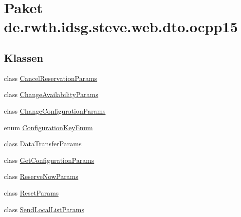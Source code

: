 \hypertarget{namespacede_1_1rwth_1_1idsg_1_1steve_1_1web_1_1dto_1_1ocpp15}{\section{Paket de.\-rwth.\-idsg.\-steve.\-web.\-dto.\-ocpp15}
\label{namespacede_1_1rwth_1_1idsg_1_1steve_1_1web_1_1dto_1_1ocpp15}
}
\subsection*{Klassen}
\begin{DoxyCompactItemize}
\item 
class \hyperlink{classde_1_1rwth_1_1idsg_1_1steve_1_1web_1_1dto_1_1ocpp15_1_1_cancel_reservation_params}{Cancel\-Reservation\-Params}
\item 
class \hyperlink{classde_1_1rwth_1_1idsg_1_1steve_1_1web_1_1dto_1_1ocpp15_1_1_change_availability_params}{Change\-Availability\-Params}
\item 
class \hyperlink{classde_1_1rwth_1_1idsg_1_1steve_1_1web_1_1dto_1_1ocpp15_1_1_change_configuration_params}{Change\-Configuration\-Params}
\item 
enum \hyperlink{enumde_1_1rwth_1_1idsg_1_1steve_1_1web_1_1dto_1_1ocpp15_1_1_configuration_key_enum}{Configuration\-Key\-Enum}
\item 
class \hyperlink{classde_1_1rwth_1_1idsg_1_1steve_1_1web_1_1dto_1_1ocpp15_1_1_data_transfer_params}{Data\-Transfer\-Params}
\item 
class \hyperlink{classde_1_1rwth_1_1idsg_1_1steve_1_1web_1_1dto_1_1ocpp15_1_1_get_configuration_params}{Get\-Configuration\-Params}
\item 
class \hyperlink{classde_1_1rwth_1_1idsg_1_1steve_1_1web_1_1dto_1_1ocpp15_1_1_reserve_now_params}{Reserve\-Now\-Params}
\item 
class \hyperlink{classde_1_1rwth_1_1idsg_1_1steve_1_1web_1_1dto_1_1ocpp15_1_1_reset_params}{Reset\-Params}
\item 
class \hyperlink{classde_1_1rwth_1_1idsg_1_1steve_1_1web_1_1dto_1_1ocpp15_1_1_send_local_list_params}{Send\-Local\-List\-Params}
\end{DoxyCompactItemize}
